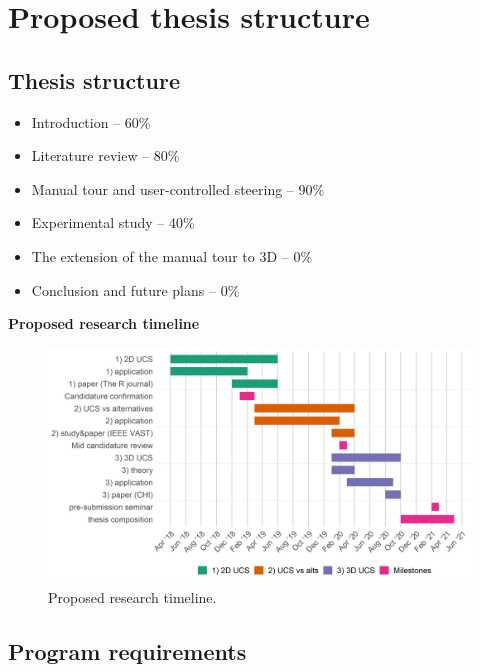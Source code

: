 \documentclass[
  11,
]{article}
\providecommand{\tightlist}{%
  \setlength{\itemsep}{0pt}\setlength{\parskip}{0pt}}
\begin{document}
\hypertarget{proposed-thesis-structure}{%
\section{Proposed thesis structure}\label{proposed-thesis-structure}}

\hypertarget{thesis-structure}{%
\subsection{Thesis structure}\label{thesis-structure}}

\begin{itemize}
\tightlist
\item
  Introduction -- 60\%
\item
  Literature review -- 80\%
\item
  Manual tour and user-controlled steering -- 90\%
\item
  Experimental study -- 40\%
\item
  The extension of the manual tour to 3D -- 0\%
\item
  Conclusion and future plans -- 0\%
\end{itemize}

\textbf{Proposed research timeline}

\begin{figure}[h]

{\centering \includegraphics[width=1\linewidth,]{figures/phd_timeline} 

}

\caption{Proposed research timeline.}\label{fig:timeline}
\end{figure}

\hypertarget{program-requirements}{%
\subsection{Program requirements}\label{program-requirements}}
\end{document}
